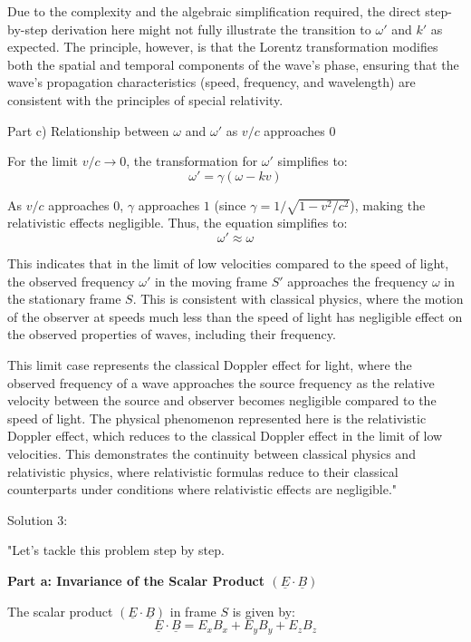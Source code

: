 Due to the complexity and the algebraic simplification required, the direct step-by-step derivation here might not fully illustrate the transition to \(\omega'\) and \(k'\) as expected. The principle, however, is that the Lorentz transformation modifies both the spatial and temporal components of the wave's phase, ensuring that the wave's propagation characteristics (speed, frequency, and wavelength) are consistent with the principles of special relativity.

Part c) Relationship between \( \omega \) and \( \omega' \) as \( v/c \) approaches \( 0 \)

For the limit \( v/c \rightarrow 0 \), the transformation for \( \omega' \) simplifies to:
\[ \omega' = \gamma(\omega - kv) \]

As \( v/c \) approaches \( 0 \), \( \gamma \) approaches \( 1 \) (since \( \gamma = 1/\sqrt{1 - v^2/c^2} \)), making the relativistic effects negligible. Thus, the equation simplifies to:
\[ \omega' \approx \omega \]

This indicates that in the limit of low velocities compared to the speed of light, the observed frequency \( \omega' \) in the moving frame \( S' \) approaches the frequency \( \omega \) in the stationary frame \( S \). This is consistent with classical physics, where the motion of the observer at speeds much less than the speed of light has negligible effect on the observed properties of waves, including their frequency.

This limit case represents the classical Doppler effect for light, where the observed frequency of a wave approaches the source frequency as the relative velocity between the source and observer becomes negligible compared to the speed of light. The physical phenomenon represented here is the relativistic Doppler effect, which reduces to the classical Doppler effect in the limit of low velocities. This demonstrates the continuity between classical physics and relativistic physics, where relativistic formulas reduce to their classical counterparts under conditions where relativistic effects are negligible."

Solution 3:

"Let's tackle this problem step by step.

\textbf{Part a: Invariance of the Scalar Product \( (\underline{E} \cdot \underline{B}) \)}

The scalar product \( (\underline{E} \cdot \underline{B}) \) in frame \( S \) is given by:
\[
\underline{E} \cdot \underline{B} = E_{x}B_{x} + E_{y}B_{y} + E_{z}B_{z}
\]

